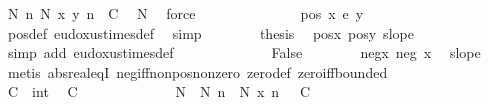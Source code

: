 \begin{isabellebody}
\ {\isachardoublequoteopen}{\isasymexists}N{\isacharprime}{\kern0pt}{\isachardot}{\kern0pt}\ {\isasymforall}n{\isasymge}\ N{\isacharprime}{\kern0pt}{\isachardot}{\kern0pt}\ x\ {\isacharparenleft}{\kern0pt}y\ n{\isacharparenright}{\kern0pt}\ {\isasymge}\ C{\isachardoublequoteclose}\ \isamarkupfalse%
\ N\ \isamarkupfalse%
\ force\isanewline
\ \ \ \ \ \ \isacommand{{\isacharbraceright}{\kern0pt}}\isamarkupfalse%
\isanewline
\ \ \ \ \ \ \isamarkupfalse%
\ {\isachardoublequoteopen}pos\ {\isacharparenleft}{\kern0pt}x\ {\isacharasterisk}{\kern0pt}\isactrlsub e\ y{\isacharparenright}{\kern0pt}{\isachardoublequoteclose}\ \isamarkupfalse%
\ pos{\isacharunderscore}{\kern0pt}def\ eudoxus{\isacharunderscore}{\kern0pt}times{\isacharunderscore}{\kern0pt}def\ \isamarkupfalse%
\ simp\isanewline
\ \ \ \ \ \ \isamarkupfalse%
\ {\isacharquery}{\kern0pt}thesis\ \isamarkupfalse%
\ pos{\isacharunderscore}{\kern0pt}x\ pos{\isacharunderscore}{\kern0pt}y\ slope\ \isamarkupfalse%
\ {\isacharparenleft}{\kern0pt}simp\ add{\isacharcolon}{\kern0pt}\ eudoxus{\isacharunderscore}{\kern0pt}times{\isacharunderscore}{\kern0pt}def{\isacharparenright}{\kern0pt}\isanewline
\ \ \ \ \isamarkupfalse%
\isanewline
\ \ \ \ \ \ \isamarkupfalse%
\ {\isacharunderscore}{\kern0pt}{\isacharcolon}{\kern0pt}\ False\isanewline
\ \ \ \ \ \ \isamarkupfalse%
\ neg{\isacharunderscore}{\kern0pt}x{\isacharcolon}{\kern0pt}\ {\isachardoublequoteopen}neg\ x{\isachardoublequoteclose}\ \isamarkupfalse%
\ slope\ \isamarkupfalse%
\ {\isacharparenleft}{\kern0pt}metis\ abs{\isacharunderscore}{\kern0pt}real{\isacharunderscore}{\kern0pt}eqI\ neg{\isacharunderscore}{\kern0pt}iff{\isacharunderscore}{\kern0pt}nonpos{\isacharunderscore}{\kern0pt}nonzero\ zero{\isacharunderscore}{\kern0pt}def\ zero{\isacharunderscore}{\kern0pt}iff{\isacharunderscore}{\kern0pt}bounded{\isacharparenright}{\kern0pt}\isanewline
\ \ \ \ \ \ \isacommand{{\isacharbraceleft}{\kern0pt}}\isamarkupfalse%
\isanewline
\ \ \ \ \ \ \ \ \isamarkupfalse%
\ C\ {\isacharcolon}{\kern0pt}{\isacharcolon}{\kern0pt}\ int\ \isamarkupfalse%
\ {\isachardoublequoteopen}C\ {\isasymge}\ {}{\isachardoublequoteclose}\isanewline
\ \ \ \ \ \ \ \ \isamarkupfalse%
\ \isamarkupfalse%
\ N\ \ N{\isacharcolon}{\kern0pt}\ {\isachardoublequoteopen}{\isasymforall}n\ {\isasymge}\ N{\isachardot}{\kern0pt}\ x\ n\ {\isasymle}\ {\isacharminus}{\kern0pt}\ C{\isachardoublequoteclose}\ \isamarkupfalse%

\end{isabellebody}
